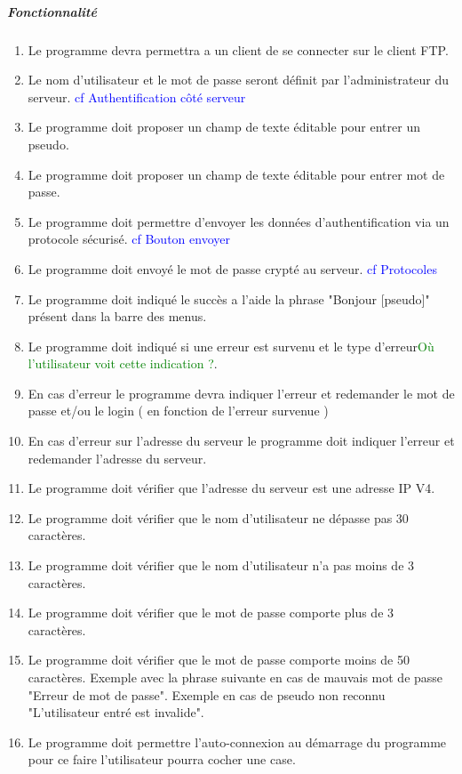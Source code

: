 \documentclass[10pt,a4paper]{report}
\begin{document}
	\subparagraph{Fonctionnalité}
	\begin{enumerate}
		\item Le programme devra permettra a un client de se connecter sur le client FTP.
		\item Le nom d'utilisateur et le mot de passe seront définit par l'administrateur du serveur. \textcolor{blue}{cf Authentification côté serveur}
		\item Le programme doit proposer un champ de texte éditable pour entrer un pseudo.
		\item Le programme doit proposer un champ de texte éditable pour entrer mot de passe.
		\item Le programme doit permettre d'envoyer les données d'authentification via un protocole sécurisé. \textcolor{blue}{cf Bouton envoyer}
		\item Le programme doit envoyé le mot de passe crypté au serveur. \textcolor{blue}{cf Protocoles}
		\item Le programme doit indiqué le succès a l'aide la phrase "Bonjour [pseudo]" présent dans la barre des menus.
		\item Le programme doit indiqué si une erreur est survenu et le type d'erreur\textcolor{green}{Où l'utilisateur voit cette indication ?}.
		\item En cas d'erreur le programme devra indiquer l'erreur et redemander le mot de passe et/ou le login ( en fonction de l'erreur survenue )
		\item En cas d'erreur sur l'adresse du serveur le programme doit indiquer l'erreur et redemander l'adresse du serveur.
		\item Le programme doit vérifier que l'adresse du serveur est une adresse IP V4.
		\item Le programme doit vérifier que le nom d'utilisateur ne dépasse pas 30 caractères.
		\item Le programme doit vérifier que le nom d'utilisateur n'a pas moins de 3 caractères.
		\item Le programme doit vérifier que le mot de passe comporte plus de 3 caractères.
		\item Le programme doit vérifier que le mot de passe comporte moins de 50 caractères.
		\subitem Exemple avec la phrase suivante en cas de mauvais mot de passe "Erreur de mot de passe".
		\subitem Exemple en cas de pseudo non reconnu "L'utilisateur entré est invalide".
		\item Le programme doit permettre l'auto-connexion au démarrage du programme pour ce faire l'utilisateur pourra cocher une case.
	
	\end{enumerate}
\end{document}
